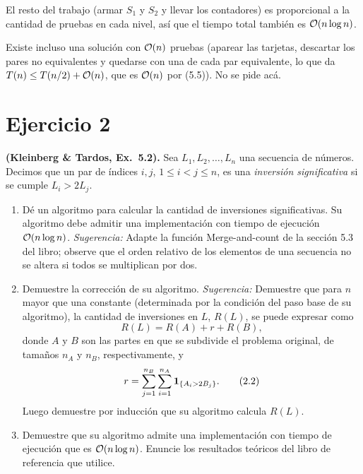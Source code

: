 El resto del trabajo (armar $S_1$ y $S_2$ y llevar los contadores) es proporcional a la
cantidad de pruebas en cada nivel, así que el tiempo total también es $\mathcal{O}(n\log n)$.

\begin{observacion}
Existe incluso una solución con $\mathcal{O}(n)$ pruebas (aparear las
tarjetas, descartar los pares no equivalentes y quedarse con una de cada par equivalente,
lo que da $T(n)\le T(n/2)+\mathcal{O}(n)$, que es $\mathcal{O}(n)$ por (5.5)). No se pide acá.
\end{observacion}

\section{Ejercicio 2}

\begin{enunciado}
\textbf{(Kleinberg \& Tardos, Ex.\ 5.2).} Sea $L_1,L_2,\dots,L_n$ una secuencia de
números. Decimos que un par de índices $i,j$, $1\le i<j\le n$, es una \emph{inversión
significativa} si se cumple $L_i>2L_j$.
\begin{enumerate}[label=(\alph*)]
\item Dé un algoritmo para calcular la cantidad de inversiones significativas. Su
algoritmo debe admitir una implementación con tiempo de ejecución $\mathcal{O}(n\log n)$.
\emph{Sugerencia:} Adapte la función Merge-and-count de la sección 5.3 del libro; observe
que el orden relativo de los elementos de una secuencia no se altera si todos se
multiplican por dos.
\item Demuestre la corrección de su algoritmo. \emph{Sugerencia:} Demuestre que para $n$
mayor que una constante (determinada por la condición del paso base de su algoritmo), la
cantidad de inversiones en $L$, $R(L)$, se puede expresar como
\[ R(L)=R(A)+r+R(B), \tag{2.1}\]
donde $A$ y $B$ son las partes en que se subdivide el problema original, de tamaños $n_A$
y $n_B$, respectivamente, y
\[ r=\sum_{j=1}^{n_B}\sum_{i=1}^{n_A}\mathbf{1}_{\{A_i>2B_j\}}. \tag{2.2}\]
Luego demuestre por inducción que su algoritmo calcula $R(L)$.
\item Demuestre que su algoritmo admite una implementación con tiempo de ejecución que
es $\mathcal{O}(n\log n)$. Enuncie los resultados teóricos del libro de referencia que utilice.
\end{enumerate}
\end{enunciado}


